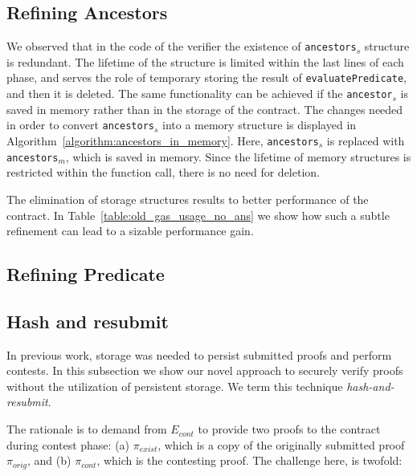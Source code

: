 

\subsection{Refining Ancestors}

We observed that in the code of the verifier the existence of
\texttt{ancestors}$_s$ structure is redundant. The lifetime of the structure is
limited within the last lines of each phase, and serves the role of temporary
storing the result of \texttt{evaluatePredicate}, and then it is deleted. The
same functionality can be achieved if the \texttt{ancestor}$_s$ is saved in
memory rather than in the storage of the contract. The changes needed in order
to convert \texttt{ancestors}$_s$ into a memory structure is displayed in
Algorithm~\ref{algorithm:ancestors_in_memory}. Here, \texttt{ancestors}$_s$ is
replaced with \texttt{ancestors}$_{m}$, which is saved in memory. Since the
lifetime of memory structures is restricted within the function call, there is
no need for deletion.



The elimination of storage structures results to better performance of the
contract. In Table~\ref{table:old_gas_usage_no_ans} we show how such a subtle
refinement can lead to a sizable performance gain.



\subsection{Refining Predicate}


\subsection{Hash and resubmit}

In previous work, storage was needed to persist submitted proofs and perform
contests. In this subsection we show our novel approach to securely verify
proofs without the utilization of persistent storage. We term this technique
\emph{hash-and-resubmit}.

The rationale is to demand from $E_{cont}$ to provide two proofs to the
contract during contest phase: (a) $\pi_{exist}$, which is a copy of the
originally submitted proof $\pi_{orig}$, and (b) $\pi_{cont}$, which is the
contesting proof. The challenge here, is twofold:

